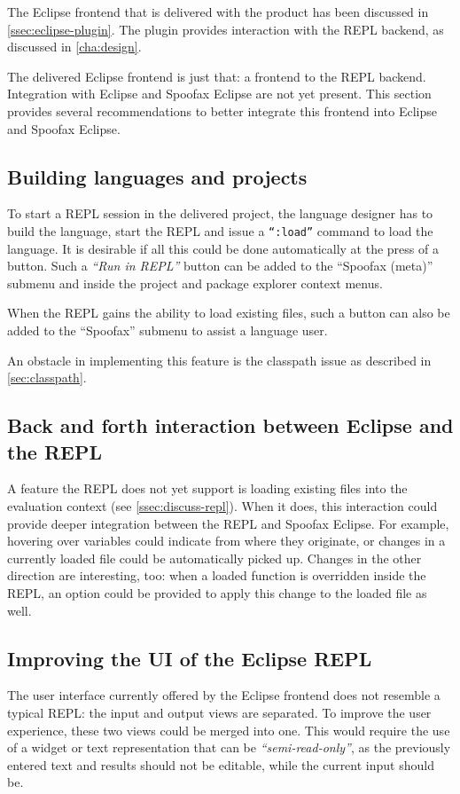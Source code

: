 The Eclipse frontend that is delivered with the product has been discussed in
\cref{ssec:eclipse-plugin}. The plugin provides interaction with the REPL
backend, as discussed in \cref{cha:design}.

The delivered Eclipse frontend is just that: a frontend to the REPL backend.
Integration with Eclipse and Spoofax Eclipse are not yet present. This
section provides several recommendations to better integrate this frontend
into Eclipse and Spoofax Eclipse.

\subsection{Building languages and projects}

To start a REPL session in the delivered project, the language designer has to
build the language, start the REPL and issue a \texttt{``:load''} command to
load the language. It is desirable if all this could be done automatically at
the press of a button. Such a \textit{``Run in REPL''} button can be added to the
``Spoofax (meta)'' submenu and inside the project and package explorer context
menus.

When the REPL gains the ability to load existing files, such a button can also
be added to the ``Spoofax'' submenu to assist a language user.

An obstacle in implementing this feature is the classpath issue as described in
\cref{sec:classpath}.

\subsection{Back and forth interaction between Eclipse and the REPL}

A feature the REPL does not yet support is loading existing files into the
evaluation context (see \cref{ssec:discuss-repl}). When it does, this interaction
could provide deeper integration between the REPL and Spoofax Eclipse. For
example, hovering over variables could indicate from where they originate, or
changes in a currently loaded file could be automatically picked up. Changes in
the other direction are interesting, too: when a loaded function is overridden
inside the REPL, an option could be provided to apply this change to the loaded
file as well.

\subsection{Improving the UI of the Eclipse REPL}

The user interface currently offered by the Eclipse frontend does not resemble a
typical REPL: the input and output views are separated. To improve the user
experience, these two views could be merged into one. This would require the use
of a widget or text representation that can be \textit{``semi-read-only''}, as
the previously entered text and results should not be editable, while the
current input should be.

